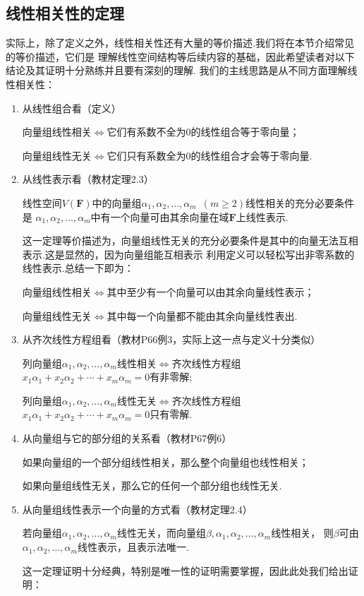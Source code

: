 \subsection{线性相关性的定理}
实际上，除了定义之外，线性相关性还有大量的等价描述.我们将在本节介绍常见的等价描述，它们是
理解线性空间结构等后续内容的基础，因此希望读者对以下结论及其证明十分熟练并且要有深刻的理解.
我们的主线思路是从不同方面理解线性相关性：
\begin{enumerate}
    \item 从线性组合看（定义）

          向量组线性相关$\iff$它们有系数不全为0的线性组合等于零向量；

          向量组线性无关$\iff$它们只有系数全为0的线性组合才会等于零向量.
    \item 从线性表示看（教材定理2.3）
          \begin{theorem}
              线性空间$V(\mathbf{F})$中的向量组$\alpha_1,\alpha_2,\ldots,\alpha_m\enspace(m \geqslant 2)$线性相关的充分必要条件是
              $\alpha_1,\alpha_2,\ldots,\alpha_m$中有一个向量可由其余向量在域$\mathbf{F}$上线性表示.
          \end{theorem}
          这一定理等价描述为，向量组线性无关的充分必要条件是其中的向量无法互相表示.这是显然的，因为向量组能互相表示
          利用定义可以轻松写出非零系数的线性表示.总结一下即为：

          向量组线性相关$\iff$其中至少有一个向量可以由其余向量线性表示；

          向量组线性无关$\iff$其中每一个向量都不能由其余向量线性表出.
    \item 从齐次线性方程组看（教材P66例3，实际上这一点与定义十分类似）

          列向量组$\alpha_1,\alpha_2,\ldots,\alpha_m$线性相关$\iff$齐次线性方程组$x_1\alpha_1+x_2\alpha_2+\cdots+x_m\alpha_m=0$有非零解;

          列向量组$\alpha_1,\alpha_2,\ldots,\alpha_m$线性无关$\iff$齐次线性方程组$x_1\alpha_1+x_2\alpha_2+\cdots+x_m\alpha_m=0$只有零解.
    \item 从向量组与它的部分组的关系看（教材P67例6）

          如果向量组的一个部分组线性相关，那么整个向量组也线性相关；

          如果向量组线性无关，那么它的任何一个部分组也线性无关.
    \item 从向量组线性表示一个向量的方式看（教材定理2.4）
          \begin{theorem}\label{thm:3:线性无关等价表示唯一}
              若向量组$\alpha_1,\alpha_2,\ldots,\alpha_m$线性无关，而向量组$\beta,\alpha_1,\alpha_2,\ldots,\alpha_m$线性相关，
              则$\beta$可由$\alpha_1,\alpha_2,\ldots,\alpha_m$线性表示，且表示法唯一.
          \end{theorem}
          这一定理证明十分经典，特别是唯一性的证明需要掌握，因此此处我们给出证明：


\end{enumerate}
